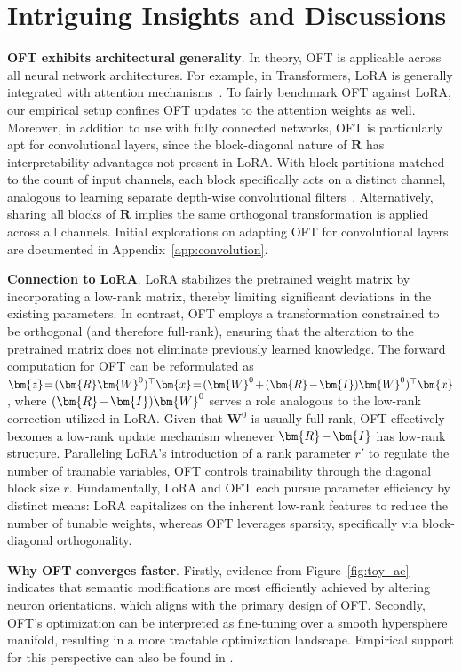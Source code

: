 \section{Intriguing Insights and Discussions}

\textbf{OFT exhibits architectural generality}. In theory, OFT is applicable across all neural network architectures. For example, in Transformers, LoRA is generally integrated with attention mechanisms~\cite{hulora2022}. To fairly benchmark OFT against LoRA, our empirical setup confines OFT updates to the attention weights as well. Moreover, in addition to use with fully connected networks, OFT is particularly apt for convolutional layers, since the block-diagonal nature of $\bm{R}$ has interpretability advantages not present in LoRA. With block partitions matched to the count of input channels, each block specifically acts on a distinct channel, analogous to learning separate depth-wise convolutional filters~\cite{chollet2017xception}. Alternatively, sharing all blocks of $\bm{R}$ implies the same orthogonal transformation is applied across all channels. Initial explorations on adapting OFT for convolutional layers are documented in Appendix~\ref{app:convolution}.

\textbf{Connection to LoRA}. LoRA stabilizes the pretrained weight matrix by incorporating a low-rank matrix, thereby limiting significant deviations in the existing parameters. In contrast, OFT employs a transformation constrained to be orthogonal (and therefore full-rank), ensuring that the alteration to the pretrained matrix does not eliminate previously learned knowledge. The forward computation for OFT can be reformulated as $\thickmuskip=2mu \medmuskip=2mu \bm{z}=(\bm{R}\bm{W}^0)^\top\bm{x}=(\bm{W}^0+(\bm{R}-\bm{I})\bm{W}^0)^\top\bm{x}$, where $\thickmuskip=2mu \medmuskip=2mu (\bm{R}-\bm{I})\bm{W}^0$ serves a role analogous to the low-rank correction utilized in LoRA. Given that $\bm{W}^0$ is usually full-rank, OFT effectively becomes a low-rank update mechanism whenever $\thickmuskip=2mu \medmuskip=2mu \bm{R}-\bm{I}$ has low-rank structure. Paralleling LoRA's introduction of a rank parameter $r'$ to regulate the number of trainable variables, OFT controls trainability through the diagonal block size $r$. Fundamentally, LoRA and OFT each pursue parameter efficiency by distinct means: LoRA capitalizes on the inherent low-rank features to reduce the number of tunable weights, whereas OFT leverages sparsity, specifically via block-diagonal orthogonality.

\textbf{Why OFT converges faster}. Firstly, evidence from Figure~\ref{fig:toy_ae} indicates that semantic modifications are most efficiently achieved by altering neuron orientations, which aligns with the primary design of OFT. Secondly, OFT's optimization can be interpreted as fine-tuning over a smooth hypersphere manifold, resulting in a more tractable optimization landscape. Empirical support for this perspective can also be found in \cite{liu2021orthogonal}.

